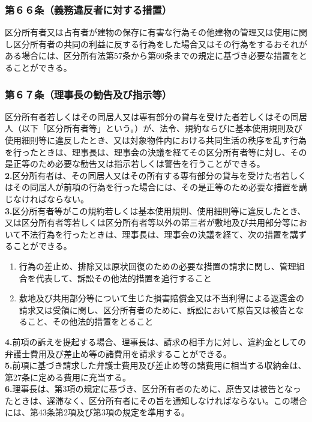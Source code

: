\documentclass[12pt,uplatex]{jsarticle}
\begin{document}
\subsubsection*{第６６条（義務違反者に対する措置）}
区分所有者又は占有者が建物の保存に有害な行為その他建物の管理又は使用に関し区分所有者の共同の利益に反する行為をした場合又はその行為をするおそれがある場合には、区分所有法第57条から第60条までの規定に基づき必要な措置をとることができる。
\subsubsection*{第６７条（理事長の勧告及び指示等）}
区分所有者若しくはその同居人又は専有部分の貸与を受けた者若しくはその同居人（以下「区分所有者等」という。）が、法令、規約ならびに基本使用規則及び使用細則等に違反したとき、又は対象物件内における共同生活の秩序を乱す行為を行ったときは、理事長は、理事会の決議を経てその区分所有者等に対し、その是正等のため必要な勧告又は指示若しくは警告を行うことができる。\\
\textbf{2.}区分所有者は、その同居人又はその所有する専有部分の貸与を受けた者若しくはその同居人が前項の行為を行った場合には、その是正等のため必要な措置を講じなければならない。\\
\textbf{3.}区分所有者等がこの規約若しくは基本使用規則、使用細則等に違反したとき、又は区分所有者等若しくは区分所有者等以外の第三者が敷地及び共用部分等において不法行為を行ったときは、理事長は、理事会の決議を経て、次の措置を講ずることができる。
\begin{enumerate}
\item 行為の差止め、排除又は原状回復のための必要な措置の請求に関し、管理組合を代表して、訴訟その他法的措置を追行すること
\item 敷地及び共用部分等について生じた損害賠償金又は不当利得による返還金の請求又は受領に関し、区分所有者のために、訴訟において原告又は被告となること、その他法的措置をとること
\end{enumerate}
\textbf{4.}前項の訴えを提起する場合、理事長は、請求の相手方に対し、違約金としての弁護士費用及び差止め等の諸費用を請求することができる。\\
\textbf{5.}前項に基づき請求した弁護士費用及び差止め等の諸費用に相当する収納金は、第27条に定める費用に充当する。\\
\textbf{6.}理事長は、第3項の規定に基づき、区分所有者のために、原告又は被告となったときは、遅滞なく、区分所有者にその旨を通知しなければならない。この場合には、第43条第2項及び第3項の規定を準用する。
\end{document}
